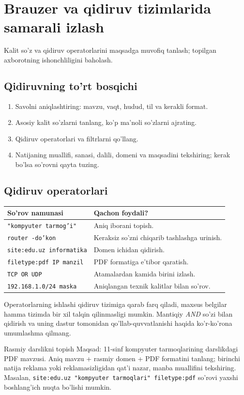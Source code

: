 \documentclass[11pt,a4paper,oneside]{book}
\newcommand{\ip}[1]{\texttt{#1}}
\begin{document}
\chapter{Brauzer va qidiruv tizimlarida samarali izlash}
\begin{goal}Kalit so'z va qidiruv operatorlarini maqsadga muvofiq tanlash; topilgan axborotning ishonchliligini baholash.\end{goal}
\section{Qidiruvning to'rt bosqichi}
\begin{enumerate}
\item Savolni aniqlashtiring: mavzu, vaqt, hudud, til va kerakli format.
\item Asosiy kalit so'zlarni tanlang, ko'p ma'noli so'zlarni ajrating.
\item Qidiruv operatorlari va filtrlarni qo'llang.
\item Natijaning muallifi, sanasi, dalili, domeni va maqsadini tekshiring; kerak bo'lsa so'rovni qayta tuzing.
\end{enumerate}
\section{Qidiruv operatorlari}
\par\medskip
\par\medskip
\begin{tabularx}{\textwidth}{p{}Y}\toprule
So'rov namunasi & Qachon foydali?\\\midrule
\ip{"kompyuter tarmog'i"} & Aniq iborani topish.\\
\ip{router -do'kon} & Keraksiz so'zni chiqarib tashlashga urinish.\\
\ip{site:edu.uz informatika} & Domen ichidan qidirish.\\
\ip{filetype:pdf IP manzil} & PDF formatiga e'tibor qaratish.\\
\ip{TCP OR UDP} & Atamalardan kamida birini izlash.\\
\ip{192.168.1.0/24 maska} & Aniqlangan texnik kalitlar bilan so'rov.\\\bottomrule\end{tabularx}
Operatorlarning ishlashi qidiruv tizimiga qarab farq qiladi, maxsus belgilar hamma tizimda bir xil talqin qilinmasligi mumkin. Mantiqiy \emph{AND} so'zi bilan qidirish va uning dastur tomonidan qo'llab-quvvatlanishi haqida ko'r-ko'rona umumlashma qilmang.
\begin{worked}{Rasmiy darslikni topish}
Maqsad: 11-sinf kompyuter tarmoqlarining darslikdagi PDF mavzusi. Aniq mavzu + rasmiy domen + PDF formatini tanlang; birinchi natija reklama yoki reklamasizligidan qat'i nazar, manba muallifini tekshiring. Masalan, \ip{site:edu.uz "kompyuter tarmoqlari" filetype:pdf} so'rovi yaxshi boshlang'ich nuqta bo'lishi mumkin.
\end{worked}
\end{document}
